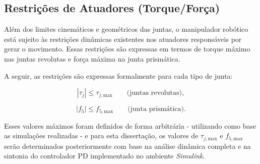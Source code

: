 \subsection{Restrições de Atuadores (Torque/Força)}

Além dos limites cinemáticos e geométricos das juntas, o manipulador robótico está sujeito às restrições dinâmicas existentes nos atuadores responsáveis por gerar o movimento.  
Essas restrições são expressas em termos de torque máximo nas juntas revolutas e força máxima na junta prismática.

A seguir, as restrições são expressas formalmente para cada tipo de junta:

\begin{equation}
\label{eq:limite_torque}
|\tau_j| \leq \tau_{j,\text{max}} \qquad \text{(juntas revolutas)},
\end{equation}

\begin{equation}
\label{eq:limite_forca}
|f_5| \leq f_{5,\text{max}} \qquad \text{(junta prismática)}.
\end{equation}

Esses valores máximos foram definidos de forma arbitrária - utilizando como base as simulações realizadas - e para esta dissertação, os valores de $\tau_{j,\text{max}}$ e $f_{5,\text{max}}$ serão determinados posteriormente com base na análise dinâmica completa e na sintonia do controlador PD implementado no ambiente \emph{Simulink}.  

